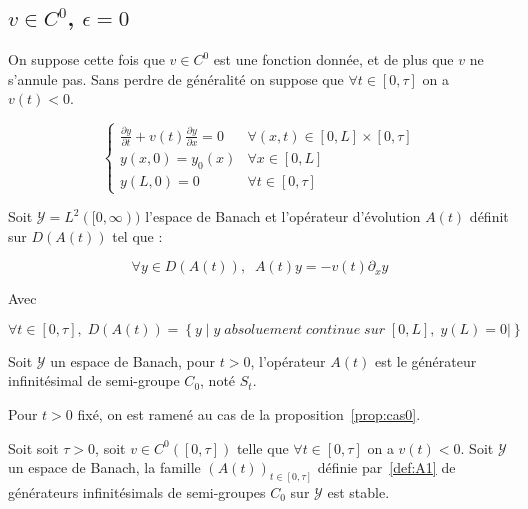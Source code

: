 \documentclass[a4paper]{article}
\begin{document}
\subsection{$v \in C^0$, $\epsilon = 0$}


On suppose cette fois que $v \in C^0$ est une fonction donnée, et de plus que $v$ ne s'annule pas. 
Sans perdre de généralité on suppose que $\forall t \in [0,\tau]$ on a $v(t)<0$.

\begin{equation}
\label{eq:cas1}
\begin{cases}
 \displaystyle \frac{\partial y}{\partial t}
 + v(t) \frac{\partial y} {\partial x}  
 = 0  & \forall (x,t) \in [0,L] \times [0, \tau]\\
 y(x,0) = y_{0} (x) & \forall x \in [0,L]\\
 y(L,0) = 0 & \forall t \in [0,\tau]
\end{cases}
\end{equation}

Soit $\mathscr{Y} = L^2([0,\infty))$ l'espace de Banach et l'opérateur d'évolution $A(t)$ définit sur $D(A(t))$ tel que :

\begin{equation}
	\label{def:A1}
	\forall y \in D(A(t)), \; \; A(t)y = -v(t)\partial_x y 
\end{equation}

Avec 

\[\forall t \in [0,\tau], \; D(A(t)) = 
\left\{y \; | \; y \; absoluement \; continue \; sur \; [0,L],\; y(L) =0| \right\}\]

\begin{proposition}
	Soit $\mathscr{Y}$ un espace de Banach, pour $t>0$, 
	l'opérateur $A(t)$ est le générateur infinitésimal de semi-groupe $C_0$,
	noté $S_t$.
\end{proposition}

\begin{preuve}
	Pour $t>0$ fixé, on est ramené au cas de la proposition~\ref{prop:cas0}.
\end{preuve}

\begin{proposition}
	\label{prop:stable0}
	Soit soit $\tau>0$, soit $v \in C^0([0,\tau])$ telle que $\forall t \in [0,\tau]$ on a $v(t)<0$.
	Soit $\mathscr{Y}$ un espace de Banach, la famille $(A(t))_{t \in [0,\tau]}$ 
	définie par~\eqref{def:A1}
	de générateurs infinitésimals de semi-groupes $C_0$ sur $\mathscr{Y}$ est stable. 
\end{proposition}
\end{document}
